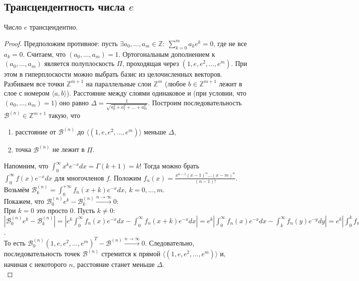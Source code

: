 \subsection{Трансцендентность числа $e$}
\begin{theorem}
	Число $e$ трансцендентно.
\end{theorem}
\begin{proof}
	Предположим противное: пусть $\displaystyle \exists a_0,\dots,a_m \in \mathbb{Z}: \ \sum\limits_{k=0}^m a_ke^k = 0$, где не все $a_k = 0$. 
	Считаем, что $\left( a_0, \dots, a_m \right)=1$. Ортогональным дополнением к $\left( a_0, \dots, a_m \right)$ является полуплоскость $\Pi$, проходящая через $\left( 1, e, e^2, \dots, e^m \right)$. При этом в гиперплоскости можно выбрать базис из целочисленных векторов.\\
	Разбиваем все точки $\mathbb{Z}^{m+1}$ на параллельные слои $\mathbb{Z}^m$ (любое $b \in \mathbb{Z}^{m+1}$ лежит в слое с номером $\langle a,b \rangle$). Расстояние между слоями одинаковое и (при условии, что $(a_0,\dots,a_m) = 1$) оно равно $\displaystyle \Delta = \frac{1}{\sqrt{a_0^2 + a_1^2 +\dots+ a_m^2}}$. Построим последовательность $\mathcal{B}^{(n)} \in \mathbb{Z}^{m+1}$ такую, что
	\begin{enumerate}
		\item[1)] расстояние от $\mathcal{B}^{(n)}$ до $\langle \left(1,e,e^2,\dots,e^m\right) \rangle$ меньше $\Delta$,
		\item[2)] точка $\mathcal{B}^{(n)}$ не лежит в $\Pi$.
	\end{enumerate}
	Напомним, что $\displaystyle \int_0^\infty x^ke^{-x}dx = \Gamma(k+1) = k!$ Тогда можно брать $\displaystyle \int_0^\infty f(x)e^{-x}dx$ для многочленов $f$. Положим $\displaystyle f_n(x) = \frac{x^{n-1}(x-1)^n\dots(x-m)^n}{(n-1)!}$. Возьмём $\displaystyle \mathcal{B}_k^{(n)} = \int_0^{+\infty} f_n(x+k)e^{-x}dx, \ k=0,\dots,m$.\\ Покажем, что $\mathcal{B}_0^{(n)}e^k - \mathcal{B}_k^{(n)} \xrightarrow{n \to \infty} 0$:\\
	При $k=0$ это просто $0$. Пусть $k \ne 0$: $\displaystyle \left| \mathcal{B}_0^{(n)}e^k - \mathcal{B}_k^{(n)} \right| = \left| e^k\int_0^\infty f_n(x)e^{-x}dx - \int_0^\infty f_n(x+k)e^{-x}dx \right| = e^k \left| \int_0^\infty f_n(x)e^{-x}dx - \int_k^\infty f_n(y)e^{-y}dy \right| = e^k \left| \int_0^k f_n(x)e^{-x}dx \right| \leq e^m m \frac{m^{n+nm-1}}{(n-1)!} = \frac{e^m m^{m(n+1)}}{(n-1)!} \xrightarrow{n \to \infty} 0$.\\
	То есть $\mathcal{B}_0^{(n)}\left( 1, e, e^2, \dots, e^m \right)^T - \mathcal{B}^{(n)} \xrightarrow{n \to \infty} 0$. Следовательно, последовательность точек $\mathcal{B}^{(n)}$ стремится к прямой $\langle \left( 1, e, e^2, \dots, e^m \right) \rangle$ и, начиная с некоторого $n$, расстояние станет меньше $\Delta$.\\

\end{proof}
